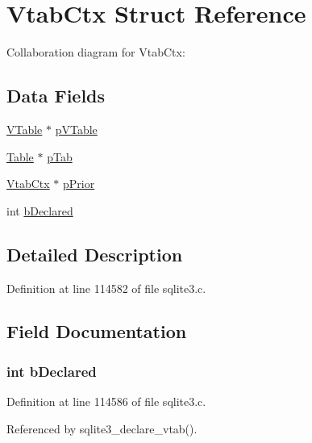 \hypertarget{struct_vtab_ctx}{}\section{Vtab\+Ctx Struct Reference}
\label{struct_vtab_ctx}


Collaboration diagram for Vtab\+Ctx\+:
\subsection*{Data Fields}
\begin{DoxyCompactItemize}
\item 
\hyperlink{struct_v_table}{V\+Table} $\ast$ \hyperlink{struct_vtab_ctx_a8d76cc75cc811868888fbf6bf8b3a460}{p\+V\+Table}
\item 
\hyperlink{struct_table}{Table} $\ast$ \hyperlink{struct_vtab_ctx_a11b1abc167f386db2ab7fc634c880c26}{p\+Tab}
\item 
\hyperlink{struct_vtab_ctx}{Vtab\+Ctx} $\ast$ \hyperlink{struct_vtab_ctx_ace2a9f53761a60c5b12887ec597e53b5}{p\+Prior}
\item 
int \hyperlink{struct_vtab_ctx_ac68b5dc886ba56da698f37d175ef42d5}{b\+Declared}
\end{DoxyCompactItemize}


\subsection{Detailed Description}


Definition at line 114582 of file sqlite3.\+c.



\subsection{Field Documentation}
\hypertarget{struct_vtab_ctx_ac68b5dc886ba56da698f37d175ef42d5}{}
\subsubsection[{b\+Declared}]{\setlength{\rightskip}{0pt plus 5cm}int b\+Declared}\label{struct_vtab_ctx_ac68b5dc886ba56da698f37d175ef42d5}


Definition at line 114586 of file sqlite3.\+c.



Referenced by sqlite3\+\_\+declare\+\_\+vtab().

